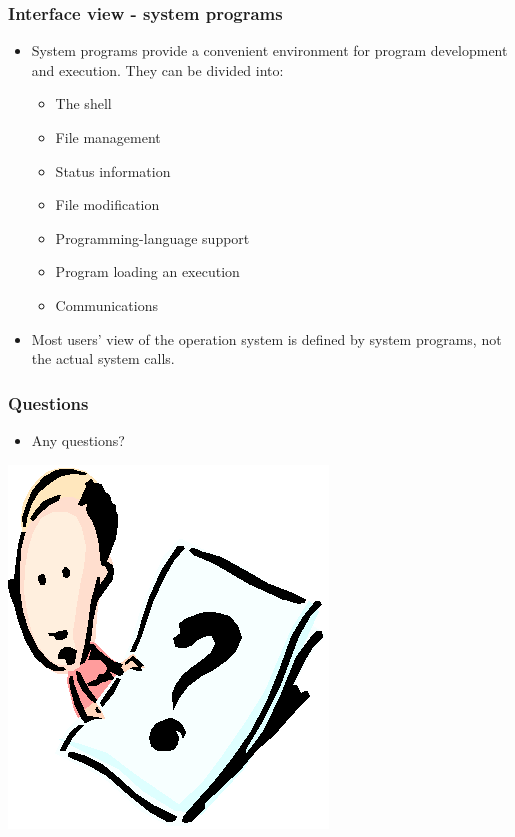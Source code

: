 \documentclass[CJKutf8,xcolor=pdftex,dvipsnames,table]{beamer}
\begin{document}
\begin{CJK*}{UTF8}{song}
  \begin{frame}
    \frametitle{Interface view - system programs} \pause
    \begin{itemize}
    \item{System programs provide a convenient environment for program development and execution. They can be divided into:} \pause
      \begin{itemize}
      \item{The shell} \pause
      \item{File management} \pause
      \item{Status information} \pause
      \item{File modification} \pause
      \item{Programming-language support} \pause
      \item{Program loading an execution} \pause
      \item{Communications} \pause
      \end{itemize}
    \item{Most users' view of the operation system is defined by system programs, not the actual system calls.}
    \end{itemize}
  \end{frame}

  \begin{frame}
    \frametitle{Questions}
    \begin{itemize}
    \item{Any questions?}
    \end{itemize}
    \begin{center}
      \includegraphics[scale=.5]{question}
    \end{center}
  \end{frame}


\end{CJK*}
\end{document}
